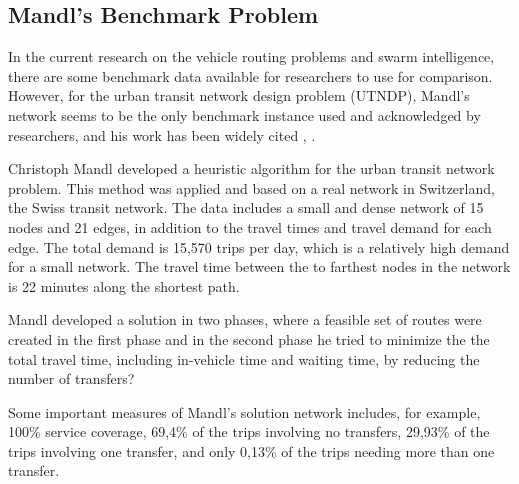 \subsection{Mandl's Benchmark Problem}

In the current research on the vehicle routing problems and swarm intelligence, there are some benchmark data available for researchers to use for comparison. However, for the urban transit network design problem (UTNDP), Mandl's network seems to be the only benchmark instance used and acknowledged by researchers, and his work has been widely cited \citep{fan09}, \citep{kechagiopoulos14}. %

Christoph Mandl \citep{mandl79} developed a heuristic algorithm for the urban transit network problem. This method was applied and based on a real network in Switzerland, the Swiss transit network\citep{mandl80}. The data includes a small and dense network of 15 nodes and 21 edges, in addition to the travel times and travel demand for each edge. The total demand is 15,570 trips per day, which is a relatively high demand for a small network. The travel time between the to farthest nodes in the network is 22 minutes along the shortest path. 

Mandl developed a solution in two phases, where a feasible set of routes were created in the first phase and in the second phase he tried to minimize the the total travel time, including in-vehicle time and waiting time, by reducing the number of transfers?


Some important measures of Mandl's solution network includes, for example, 100\% service coverage, 69,4\% of the trips involving no transfers, 29,93\% of the trips involving one transfer, and only 0,13\% of the trips needing more than one transfer. %






